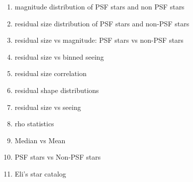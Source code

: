 \begin{enumerate}
    \item magnitude distribution of PSF stars and non PSF stars
    \item residual size distribution of PSF stars and non-PSF stars
    \item residual size vs magnitude: PSF stars vs non-PSF stars
    \item residual size vs binned seeing
    \item residual size correlation
    \item residual shape distributions
    \item residual size vs seeing
    \item rho statistics
    \item Median vs Mean
    \item PSF stars vs Non-PSF stars
    \item Eli's star catalog
\end{enumerate}

